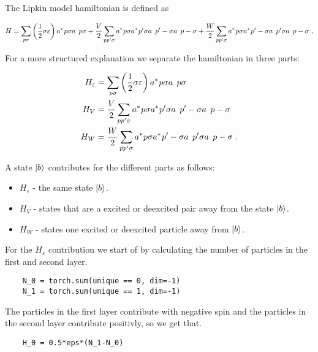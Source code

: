The Lipkin model hamiltonian is defined as

\begin{equation} 
    H = \sum_{p\sigma} \left ( \frac{1}{2} \sigma \varepsilon \right ) \hc{a}{p\sigma}\op{a}{p\sigma} + \frac{V}{2}\sum_{pp'\sigma} \hc{a}{p\sigma} \hc{a}{p'\sigma} \op{a}{p'-\sigma}\op{a}{p-\sigma} + \frac{W}{2} \sum_{pp'\sigma} \hc{a}{p\sigma} \hc{a}{p'-\sigma} \op{a}{p'\sigma}\op{a}{p-\sigma} \; , 
\end{equation}

For a more structured explanation we separate the hamiltonian in three parts:

\begin{align}
  H_{\varepsilon} &= \sum_{p\sigma} \left ( \frac{1}{2} \sigma \varepsilon \right ) \hc{a}{p\sigma}\op{a}{p\sigma}\\ 
  H_V &= \frac{V}{2}\sum_{pp'\sigma} \hc{a}{p\sigma} \hc{a}{p'\sigma} \op{a}{p'-\sigma}\op{a}{p-\sigma}\\
  H_W &= \frac{W}{2} \sum_{pp'\sigma} \hc{a}{p\sigma} \hc{a}{p'-\sigma} \op{a}{p'\sigma}\op{a}{p-\sigma}  \; .
  \label{eq:LMG_split_H}
\end{align}

 A state $\ket{b}$ contributes for the different parts as follows:

\begin{itemize}
  \item $H_{\varepsilon}$ - the same state $\ket{b}$.
  \item $H_V$ - states that are a excited or deexcited pair away from the state $\ket{b}$.
  \item $H_W$ - states one excited or deexcited particle away from $\ket{b}$.
\end{itemize}

For the $H_{\varepsilon}$ contribution we start of by calculating the number of particles in the first and second layer.

\begin{verbatim}
    N_0 = torch.sum(unique == 0, dim=-1)
    N_1 = torch.sum(unique == 1, dim=-1)
\end{verbatim}

The particles in the first layer contribute with negative spin and the particles in the second layer contribute positivly, so we get that.

\begin{verbatim} 
    H_0 = 0.5*eps*(N_1-N_0)
\end{verbatim}

